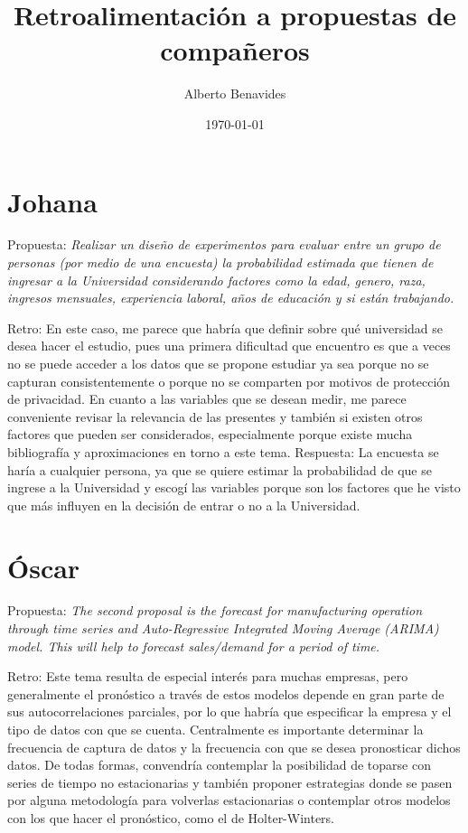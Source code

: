 \documentclass[10pt, oneside,spanish]{article}   	%
\title{Retroalimentación a propuestas de compañeros}
\author[ ]{Alberto Benavides}
\affil[ ]{Posgrado en Ingeniería de Sistemas}
\affil[ ]{Facultad de Ingeniería Mecánica y Eléctrica}
\affil[ ]{Universidad Autónoma de Nuevo León}
\date{\today}							%
\begin{document}
\maketitle

\section{Johana}

Propuesta: \emph{Realizar un diseño de experimentos para evaluar entre un grupo de personas (por medio de una encuesta) la probabilidad estimada que tienen de ingresar a la Universidad considerando factores como la edad, genero, raza, ingresos mensuales, experiencia laboral, años de educación y si están trabajando.}

Retro: En este caso, me parece que habría que definir sobre qué universidad se desea hacer el estudio, pues una primera dificultad que encuentro es que a veces no se puede acceder a los datos que se propone estudiar ya sea porque no se capturan consistentemente o porque no se comparten por motivos de protección de privacidad. En cuanto a las variables que se desean medir, me parece conveniente revisar la relevancia de las presentes y también si existen otros factores que pueden ser considerados, especialmente porque existe mucha bibliografía y aproximaciones en torno a este tema. 
Respuesta: La encuesta se haría a cualquier persona, ya que se quiere estimar la probabilidad de que se ingrese a la Universidad y escogí las variables porque son los factores que he visto que más influyen en la decisión de entrar o no a la Universidad.


\section{Óscar}

Propuesta: \emph{The second proposal is the forecast for manufacturing operation through time series and Auto-Regressive Integrated Moving Average (ARIMA) model. This will help to forecast sales/demand for a period of time.}

Retro: Este tema resulta de especial interés para muchas empresas, pero generalmente el pronóstico a través de estos modelos depende en gran parte de sus autocorrelaciones parciales, por lo que habría que especificar la empresa y el tipo de datos con que se cuenta. Centralmente es importante determinar la frecuencia de captura de datos y la frecuencia con que se desea pronosticar dichos datos. De todas formas, convendría contemplar la posibilidad de toparse con series de tiempo no estacionarias y también proponer estrategias donde se pasen por alguna metodología para volverlas estacionarias o contemplar otros modelos con los que hacer el pronóstico, como el de Holter-Winters.
\end{document}
